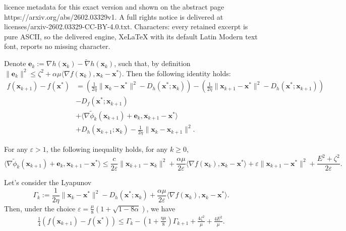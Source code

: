 \documentclass[10pt,a4paper]{amsart}
\def\eps{{\varepsilon}}
\def\ve{{\bm{e}}}
\def\vx{{\bm{x}}}
\begin{document}
licence metadata for this exact version and shown on the abstract page https://arxiv.org/abs/2602.03329v1. A full rights notice is delivered at licenses/arxiv-2602.03329-CC-BY-4.0.txt. Characters: every retained excerpt is pure ASCII, so the delivered engine, XeLaTeX with its default Latin Modern text font, reports no missing character.
\begin{lemma}
\label{app:lemma:proof_proxyprox_1}
Denote $\ve_k := \nabla h(\vx_k) - \tilde \nabla h(\vx_k)$, such that, by definition $\|\ve_k\|^2 \le \zeta^2 + \alpha \mu \langle \nabla f(\vx_k),\vx_k - \vx^*\rangle$. Then the following identity holds:
    \begin{align*}
        f(\vx_{k+1}) - f(\vx^*) &=  \left(\frac{1}{2\eta}\|\vx_{k}- \vx^*\|^2 - D_{h}(\vx^*;\vx_{k})\right) - \left(\frac{1}{2\eta}\|\vx_{k+1}- \vx^*\|^2 - D_{h}(\vx^*;\vx_{k+1}) \right) \\
        &- D_f(\vx^*;\vx_{k+1})\\
        & + \langle \nabla \tilde \phi_k(\vx_{k+1}) + \ve_k, \vx_{k+1} - \vx^* \rangle \\
        &+ D_h(\vx_{k+1};\vx_k) - \frac{1}{2\eta}\|\vx_{k}- \vx_{k+1}\|^2.
    \end{align*}
\end{lemma}

\begin{lemma}
    \label{app:lemma:proof_proxyprox_2}
    For any $\eps >1$, the following inequality holds, for any $k\ge 0$,
    \[
    \langle \nabla \tilde \phi_k(\vx_{k+1}) + \ve_k, \vx_{k+1} - \vx^*\rangle \le \frac{c}{2\eps}\|\vx_{k+1} - \vx_k\|^2  + \frac{\alpha \mu }{2\eps} \langle\nabla f(\vx_k), \vx_k - \vx^* \rangle+ \eps\|\vx_{k+1}-\vx^*\|^2 + \frac{E^2 + \zeta^2}{2\eps}.
    \]
\end{lemma}

\begin{lemma}
\label{app:lemma:proof_proxyprox_3}
    Let's consider the Lyapunov 
    \begin{equation}
    \label{app:eq:def_Lyapunov}
    \Gamma_{k} := \frac{1}{2\eta}\|\vx_k - \vx^*\|^2 - D_{h}(\vx^*;\vx_k) + \frac{\alpha \mu}{2 \eps} \langle \nabla f(\vx_k),\vx_k - \vx^*\rangle.
    \end{equation}
    Then, under the choice $\eps = \frac{\mu}{8}(1 + \sqrt{1 - 8\alpha})$, we have
    \begin{align*}
        \frac{1}{4}(f(\vx_{k+1}) - f(\vx^*)) 
        \le \Gamma_k - \left(1 +  \frac{\eta \mu}{8}\right)\Gamma_{k+1} + \frac{4\zeta^2}{\mu} + \frac{4E^2}{\mu}.
    \end{align*}
\end{lemma}
\end{document}
